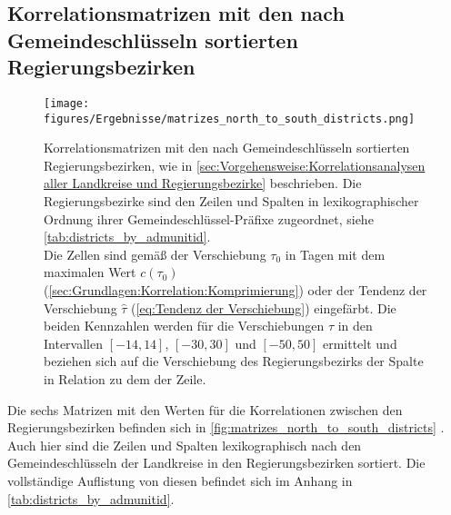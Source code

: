 \subsection{Korrelationsmatrizen mit den nach Gemeindeschlüsseln sortierten Regierungsbezirken}

\begin{figure}[H]
    \centering
    \texttt{[image: figures/Ergebnisse/matrizes\_north\_to\_south\_districts.png]}
    \caption{Korrelationsmatrizen mit den nach Gemeindeschlüsseln sortierten Regierungsbezirken, wie in \autoref{sec:Vorgehensweise:Korrelationsanalysen aller Landkreise und Regierungsbezirke} beschrieben. Die Regierungsbezirke sind den Zeilen und Spalten in lexikographischer Ordnung ihrer Gemeindeschlüssel-Präfixe zugeordnet, siehe \autoref{tab:districts_by_admunitid}.\\
    Die Zellen sind gemäß der Verschiebung $\tau_0$ in Tagen mit dem maximalen Wert $c(\tau_0)$ (\autoref{sec:Grundlagen:Korrelation:Komprimierung}) oder der Tendenz der Verschiebung $\hat{\tau}$ (\autoref{eq:Tendenz der Verschiebung}) eingefärbt. Die beiden Kennzahlen werden für die Verschiebungen $\tau$ in den Intervallen $[-14, 14]$, $[-30, 30]$ und $[-50,50]$ ermittelt und beziehen sich auf die Verschiebung des Regierungsbezirks der Spalte in Relation zu dem der Zeile.
    }
    \label{fig:matrizes_north_to_south_districts}
\end{figure}

Die sechs Matrizen mit den Werten für die Korrelationen zwischen den Regierungsbezirken befinden sich in \autoref{fig:matrizes_north_to_south_districts} . Auch hier sind die Zeilen und Spalten lexikographisch nach den Gemeindeschlüsseln der Landkreise in den Regierungsbezirken sortiert. Die vollständige Auflistung von diesen befindet sich im Anhang in \autoref{tab:districts_by_admunitid}.